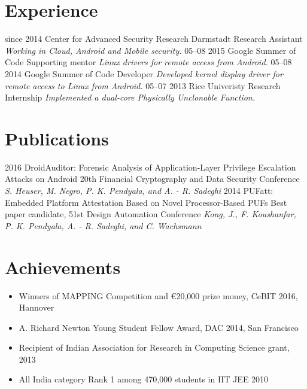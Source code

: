 \documentclass[]{friggeri-cv}
\begin{document}
\section{Experience}

\begin{entrylist}
  \entry
    {since 2014}
    {Center for Advanced Security Research Darmstadt}
    {Research Assistant}
    {\emph{Working in Cloud, Android and Mobile security.}}
  \entry
    {05–08 2015}
    {Google Summer of Code}
    {Supporting mentor}
    {\emph{Linux drivers for remote access from Android.}}
  \entry
    {05–08 2014}
    {Google Summer of Code}
    {Developer}
    {\emph{Developed kernel display driver for remote access to Linux from Android.}}
  \entry
    {05–07 2013}
    {Rice Univeristy}
    {Research Internship}
    {\emph{Implemented a dual-core Physically Unclonable Function.}}
\end{entrylist}

\section{Publications}
\begin{entrylist}
  \entry
    {2016}
    {DroidAuditor: Forensic Analysis of Application-Layer Privilege Escalation Attacks on Android}
    {20th Financial Cryptography and Data Security Conference}
    {\emph{S. Heuser, M. Negro, P. K. Pendyala, and A. - R. Sadeghi}}
  \entry
    {2014}
    {PUFatt: Embedded Platform Attestation Based on Novel Processor-Based PUFs}
    {Best paper candidate, 51st Design Automation Conference}
    {\emph{Kong, J., F. Koushanfar, P. K. Pendyala, A. - R. Sadeghi, and C. Wachsmann}}
\end{entrylist}

\section{Achievements}
\begin{itemize}
  \item Winners of MAPPING Competition and \euro 20,000 prize money, CeBIT 2016, Hannover
  \item A. Richard Newton Young Student Fellow Award, DAC 2014, San Francisco
  \item Recipient of Indian Association for Research in Computing Science grant, 2013
  \item All India category Rank 1 among 470,000 students in IIT JEE 2010
\end{itemize}
~
\end{document}
